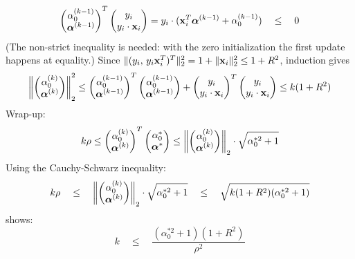   \begin{displaymath}
    \begin{pmatrix}\alpha_0^{(k-1)}\\ \bm{\mathrm{\alpha}}^{(k-1)}\end{pmatrix}^T\begin{pmatrix}y_i\\ y_i\cdot \bm{\mathrm{x}}_i\end{pmatrix}
    = y_i\cdot (\bm{\mathrm{x}}_i^T \bm{\mathrm{\alpha}}^{(k-1)} + \alpha_0^{(k-1)})\quad \leq \quad 0
  \end{displaymath}
  (The non-strict inequality is needed: with the zero initialization the first update happens at equality.)
  Since $\|(y_i,\,y_i\bm{\mathrm{x}}_i^T)^T\|_2^2=1+\|\bm{\mathrm{x}}_i\|_2^2\le 1+R^2$, induction gives
  \begin{displaymath}
    \left \|  \begin{pmatrix}\alpha_0^{(k)}\\ \bm{\mathrm{\alpha}}^{(k)}\end{pmatrix}\right\|_2^2 
    \leq \begin{pmatrix}\alpha_0^{(k-1)}\\ \bm{\mathrm{\alpha}}^{(k-1)}\end{pmatrix} ^T\begin{pmatrix}\alpha_0^{(k-1)}\\ \bm{\mathrm{\alpha}}^{(k-1)}\end{pmatrix} 
           + \begin{pmatrix}y_i\\ y_i\cdot \bm{\mathrm{x}}_i\end{pmatrix}^T\begin{pmatrix}y_i\\ y_i\cdot \bm{\mathrm{x}}_i\end{pmatrix}
    \leq k(1+R^2)
  \end{displaymath}
  Wrap-up:
  \begin{displaymath}
    k\rho 
    \leq \begin{pmatrix}\alpha_0^{(k)}\\ \bm{\mathrm{\alpha}}^{(k)}\end{pmatrix}^T\begin{pmatrix}\alpha_0^*\\ \bm{\mathrm{\alpha}}^*\end{pmatrix} 
    \leq \left \|  \begin{pmatrix}\alpha_0^{(k)}\\ \bm{\mathrm{\alpha}}^{(k)}\end{pmatrix}\right\|_2\cdot  \sqrt{\alpha_0^{*2}+1}
  \end{displaymath}
  Using the Cauchy-Schwarz inequality:
  \begin{displaymath}
    k\rho\quad
    \leq \quad \left \| \begin{pmatrix}\alpha_0^{(k)}\\ \bm{\mathrm{\alpha}}^{(k)}\end{pmatrix}\right\|_2\cdot  \sqrt{\alpha_0^{*2}+1}\quad \leq \quad  \sqrt{k(1+R^2)(\alpha_0^{*2}+1)}
  \end{displaymath}
  shows:
  \begin{displaymath}
    k \quad \leq\quad \frac{(\alpha_0^{*2}+1)(1+R^2)}{\rho^2}
  \end{displaymath}
  
